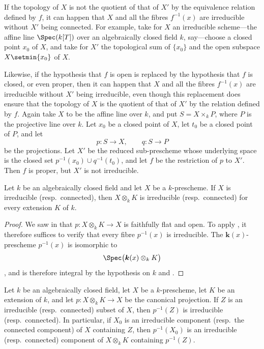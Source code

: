 \begin{remark}[4.4.3]
\label{IV.4.4.3}
If the topology of $X$ is not the quotient of that of $X'$ by the
equivalence relation defined by $f$, it can happen that $X$ and all the
fibres $f^{-1}(x)$ are irreducible without $X'$ being connected.
For example, take for $X$ an irreducible scheme---the affine line
$\Spec(k[T])$ over an algebraically closed field $k$, say---choose a
closed point $x_0$ of $X$, and take for $X'$ the topological sum of
$\{x_0\}$ and the open subspace $X\setmin\{x_0\}$ of $X$.

Likewise, if the hypothesis that $f$ is open is replaced by the
hypothesis that $f$ is closed, or even proper, then it can happen that
$X$ and all the fibres $f^{-1}(x)$ are irreducible without $X'$ being
irreducible, even though this replacement does ensure that the topology
of $X$ is the quotient of that of $X'$ by the relation defined by $f$.
Again take $X$ to be the affine line over $k$, and put $S=X\times_k P$,
where $P$ is the projective line over $k$.
Let $x_0$ be a closed point of $X$, let $t_0$ be a closed point of
$P$, and let
\[
p:S\longrightarrow X,
\qquad
q:S\longrightarrow P
\]
be the projections.
Let $X'$ be the reduced sub-prescheme whose underlying space is the
closed set $p^{-1}(x_0)\cup q^{-1}(t_0)$,
and let $f$ be the restriction of $p$ to $X'$.
Then $f$ is proper, but $X'$ is not irreducible.
\end{remark}

\begin{theorem}[4.4.4]
\label{IV.4.4.4}
Let $k$ be an algebraically closed field and let $X$ be a
$k$-prescheme.
If $X$ is irreducible \textup{(resp.\ }connected\textup{)}, then $X\otimes_k K$ is
irreducible \textup{(resp.\ }connected\textup{)} for every extension $K$ of $k$.
\end{theorem}

\begin{proof}
We saw in  that $p:X\otimes_k K\longrightarrow X$
is faithfully flat and open.
To apply , it therefore suffices to verify that every
fibre $p^{-1}(x)$ is irreducible.
The $\boldsymbol{k}(x)$-prescheme $p^{-1}(x)$ is isomorphic to
\[
\Spec\bigl(\boldsymbol{k}(x)\otimes_k K\bigr)
\]
, and is therefore integral by the hypothesis on $k$
and .
\end{proof}

\begin{corollary}[4.4.5]
\label{IV.4.4.5}
Let $k$ be an algebraically closed field, let $X$ be a $k$-prescheme,
let $K$ be an extension of $k$, and let $p:X\otimes_k K\longrightarrow X$
be the canonical projection.
If $Z$ is an irreducible \textup{(resp.\ }connected\textup{)} subset of $X$, then
$p^{-1}(Z)$ is irreducible \textup{(resp.\ }connected\textup{)}.
In particular, if $X_0$ is an irreducible component
\textup{(resp.\ }the connected component\textup{)} of $X$ containing $Z$, then
$p^{-1}(X_0)$ is an irreducible \textup{(resp.\ }connected\textup{)} component of
$X\otimes_k K$ containing $p^{-1}(Z)$.
\end{corollary}

